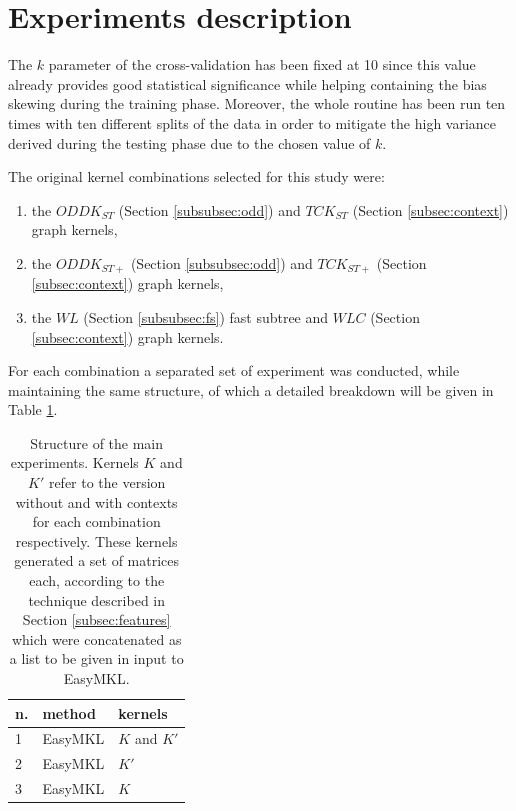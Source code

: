 
\section{Experiments description}
\label{sec:description}

The $k$ parameter of the cross-validation has been fixed at 10 since this value
already provides good statistical significance while helping containing the bias
skewing during the training phase.
Moreover, the whole routine has been run ten times with ten different splits of the
data in order to mitigate the high variance derived during the testing phase due to the
chosen value of $k$.

The original kernel combinations selected for this study were:
\begin{enumerate}
    \item the $ODDK_{ST}$ (Section \ref{subsubsec:odd}) and $TCK_{ST}$ (Section \ref{subsec:context}) graph kernels,
    \item the $ODDK_{ST+}$ (Section \ref{subsubsec:odd}) and $TCK_{ST+}$ (Section \ref{subsec:context}) graph kernels,
    \item the $WL$ (Section \ref{subsubsec:fs}) fast subtree and $WLC$ (Section \ref{subsec:context}) graph kernels.
\end{enumerate}

For each combination a separated set of experiment was conducted, while maintaining
the same structure, of which a detailed breakdown will be given in Table \ref{table:structure}.

\begin{table}[ht]
    \centering
    \begin{tabular}{|l|l|l|}
        \hline
        n. & method & kernels \\
        \hline
        1 & EasyMKL & $K$ and $K'$ \\
        \hline
        2 & EasyMKL & $K'$ \\
        \hline
        3 & EasyMKL & $K$ \\
        \hline
    \end{tabular}
    \caption{Structure of the main experiments. Kernels $K$ and $K'$ refer
    to the version without and with contexts for each combination respectively.
    These kernels generated a set of matrices each, according to the technique
    described in Section \ref{subsec:features} which were concatenated as a list
    to be given in input to EasyMKL.}
    \label{table:structure}
\end{table}


